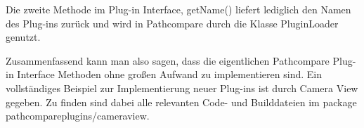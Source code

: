 Die zweite Methode im Plug-in Interface, getName() liefert lediglich den Namen
des Plug-ins zurück und wird in Pathcompare durch die Klasse PluginLoader
genutzt.

Zusammenfassend kann man also sagen, dass die eigentlichen Pathcompare Plug-in Interface
Methoden ohne großen Aufwand zu implementieren sind. Ein vollständiges
Beispiel zur Implementierung neuer Plug-ins ist durch Camera View gegeben.
Zu finden sind dabei alle relevanten Code- und Builddateien im package 
pathcompareplugins/cameraview.

